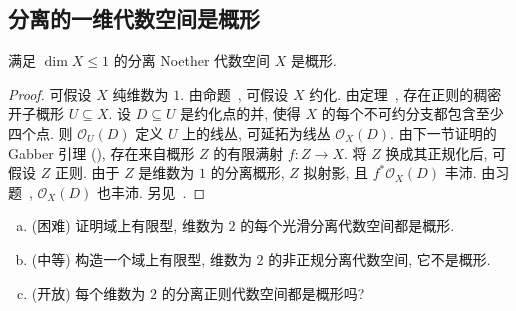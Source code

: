 \subsection{分离的一维代数空间是概形}\label{src:5.5.7-subsection}
\begin{theorem}\label{src:5.5.32}
满足 $\dim X\leq1$ 的分离 Noether 代数空间 $X$ 是概形.
\end{theorem}
\begin{proof}
可假设 $X$ 纯维数为 $1$. 由命题~, 可假设 $X$ 约化. 由定理~, 存在正则的稠密开子概形 $U\subseteq X$. 设 $D\subseteq U$ 是约化点的并, 使得 $X$ 的每个不可约分支都包含至少四个点. 则 $\mathcal O_U(D)$ 定义 $U$ 上的线丛, 可延拓为线丛 $\mathcal O_X(D)$. 由下一节证明的 Gabber 引理 (), 存在来自概形 $Z$ 的有限满射 $f:Z\to X$. 将 $Z$ 换成其正规化后, 可假设 $Z$ 正则. 由于 $Z$ 是维数为 $1$ 的分离概形, $Z$ 拟射影, 且 $f^*\mathcal O_X(D)$ 丰沛. 由习题~, $\mathcal O_X(D)$ 也丰沛. 另见~\cite[Tags 0ADD 和 09NZ]{SP}.
\end{proof}
\newpage
\begin{exercise}\label{src:5.5.33}
\begin{enumerate}[(a)]
\item (困难) 证明域上有限型, 维数为 $2$ 的每个光滑分离代数空间都是概形.
\item (中等) 构造一个域上有限型, 维数为 $2$ 的非正规分离代数空间, 它不是概形.
\item (开放) 每个维数为 $2$ 的分离正则代数空间都是概形吗?
\end{enumerate}
\end{exercise}

